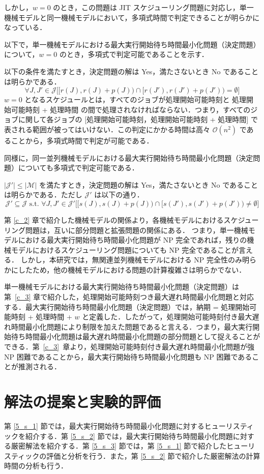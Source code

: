\documentclass[12pt]{optlab-bachelor}
\begin{document}
しかし，$w = 0$ のとき，この問題は JIT スケジューリング問題に対応し，単一機械モデルと同一機械モデルにおいて，多項式時間で判定できることが明らかになっている．

以下で，単一機械モデルにおける最大実行開始待ち時間最小化問題（決定問題）について，$w = 0$ のとき，多項式で判定可能であることを示す．

以下の条件を満たすとき，決定問題の解は Yes，満たさないとき No であることは明らかである．
$$\forall J,J' \in \mathcal{J}\bigg[\big[r(J),r(J) + p(J)\big) \cap \big[r(J'),r(J') + p(J')\big) = \emptyset\bigg]$$
$w = 0$ となるスケジュールとは，すべてのジョブが処理開始可能時刻と 処理開始可能時刻 + 処理時間 の間で処理されなければならない．つまり，すべてのジョブに関して各ジョブの [処理開始可能時刻，処理開始可能時刻 + 処理時間] で表される範囲が被ってはいけない．この判定にかかる時間は高々 $\mathcal{O}(n^2)$ であることから，多項式時間で判定が可能である．


同様に，同一並列機械モデルにおける最大実行開始待ち時間最小化問題（決定問題）についても多項式で判定可能である．

$|\mathcal{J}'| \le |\mathcal{M}|$ を満たすとき，決定問題の解は Yes，満たさないとき No であることは明らかである．ただし $\mathcal{J}'$ は以下の通り．
$$\mathcal{J}' \subseteq \mathcal{J} \text{ s.t. }\forall J,J' \in \mathcal{J}'\big[[s(J),s(J) + p(J)) \cap [s(J'),s(J') + p(J')) \neq \emptyset\big]$$

第 \ref{c_2} 章で紹介した機械モデルの関係より，各機械モデルにおけるスケジューリング問題は，互いに部分問題と拡張問題の関係にある．
つまり，単一機械モデルにおける最大実行開始待ち時間最小化問題が NP 完全であれば，残りの機械モデルにおけるスケジューリング問題についても NP 完全であることが言える．
しかし，本研究では，無関連並列機械モデルにおける NP 完全性のみ明らかにしたため，他の機械モデルにおける問題の計算複雑さは明らかでない．

単一機械モデルにおける最大実行開始待ち時間最小化問題（決定問題）は第~\ref{c_3} 章で紹介した，処理開始可能時刻つき最大遅れ時間最小化問題と対応する．最大実行開始待ち時間最小化問題（決定問題）では，納期 = 処理開始可能時刻 + 処理時間 + $w$ と定義した．したがって，処理開始可能時刻付き最大遅れ時間最小化問題により制限を加えた問題であると言える．つまり，最大実行開始待ち時間最小化問題は最大遅れ時間最小化問題の部分問題として捉えることができる．第~\ref{c_3}~章より，処理開始可能時刻付き最大遅れ時間最小化問題が強 NP 困難であることから，最大実行開始待ち時間最小化問題も NP 困難であることが推測される．

\chapter{解法の提案と実験的評価}\label{c_5}
第 \ref{5_s_1} 節では，最大実行開始待ち時間最小化問題に対するヒューリスティックを紹介する．第 \ref{5_s_2} 節では，最大実行開始待ち時間最小化問題に対する厳密解法を紹介する．第 \ref{5_s_3} 節では，第 \ref{5_s_1} 節で紹介したヒューリスティックの評価と分析を行う．また，第 \ref{5_s_2} 節で紹介した厳密解法の計算時間の分析も行う．
\end{document}
